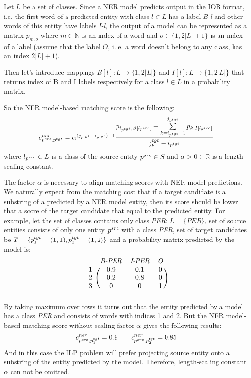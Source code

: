 Let \( L \) be a set of classes. Since a NER model predicts output in the IOB format, i.e. the first word of a predicted
entity with class \( l \in L \) has a label \textit{B-l} and other words of this entity have labels \textit{I-l},
the output of a model can be represented as a matrix \( p_{m, o} \) where \( m \in \mathbb{N} \) is an index of a word and
\( o \in \{ 1, 2|L| + 1 \} \) is an index of a label (assume that the label \( O \), i. e. a word doesn't belong to any class,
has an index \( 2|L| + 1 \)).

Then let's introduce mappings \( B[l]: L \rightarrow \{ 1, 2|L| \} \) and
\( I[l]: L \rightarrow \{ 1, 2|L| \} \) that returns index of B and I labels respectively
for a class \( l \in L \) in a probability matrix.

So the NER model-based matching score is the following:
\begin{equation} \label{eq:ner_cost}
    c_{p^{src}, p^{tgt}}^{ner} = \alpha^{(j_{p^{tgt}} - i_{p^{tgt}}) - 1}
    \frac{
        p_{i_{p^{tgt}}, B[l_{p^{src}}]} +
        \sum\limits_{k = i_{p^{tgt}} + 1}^{j_{p^{tgt}}} p_{k, I[l_{p^{src}}]}
    }
    {j_p^{tgt} - i_{p^{tgt}}}
\end{equation}
where \( l_{p^{src}} \in L \) is a class of the source entity \( p^{src} \in S \) and
\( \alpha > 0 \in \mathbb{R} \) is a length-scaling constant.

The factor \( \alpha \) is necessary to align matching scores with NER model predictions.
We naturally expect from the matching cost that if a target candidate is a substring of a predicted
by a NER model entity, then its score should be lower that a score of the target candidate that
equal to the predicted entity. For example, let the set of classes contains only class \textit{PER}: \( L = \{ PER \}\),
set of source entities consists of only one entity \( p^{src} \) with a class \textit{PER},
set of target candidates be \( T =  \{ p_1^{tgt} = (1, 1), p_2^{tgt} = (1, 2) \} \) and a probability matrix predicted by the model is:
\[
    \begin{blockarray}{cccc}
        & \text{\textit{B-PER}} & \text{\textit{I-PER}} & \text{\textit{O}} \\
        \begin{block}{c(ccc)}
            1 & 0.9 & 0.1 & 0 \\
            2 & 0.2 & 0.8 & 0 \\
            3 & 0   & 0   & 1 \\
        \end{block}
    \end{blockarray}
\]
By taking maximum over rows it turns out that the entity predicted by a model has a class \textit{PER} and
consists of words with indices 1 and 2. But the NER model-based matching score without scaling factor
\( \alpha \) gives the following results:
\[
    c_{p^{src}, p_1^{tgt}}^{ner} = 0.9 \qquad c_{p^{src}, p_2^{tgt}}^{ner} = 0.85
\]
And in this case the ILP problem will prefer projecting source entity onto a substring of the entity predicted
by the model. Therefore, length-scaling constant \( \alpha \) can not be omitted.

